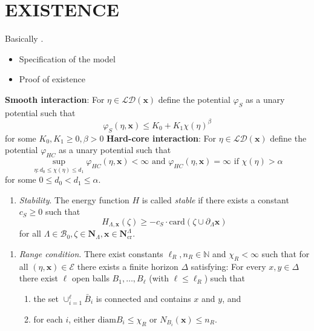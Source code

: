\documentclass{kybernetika}
\newcommand{\x}{{\mathbf{x}}}
\begin{document}
\section{EXISTENCE}
Basically \cite{DDG12}.

\begin{itemize}
\item Specification of the model
\item Proof of existence
\end{itemize}


\noindent \textbf{Smooth interaction}:  For $\eta\in\mathcal {LD}(\x)$ define the potential $\varphi_S$ as a unary potential such that
$$\varphi_S(\eta,\x) \leq K_0 + K_1 \chi(\eta)^{\beta}$$
for some $K_0,K_1 \geq 0, \beta >0$\newline
\textbf{Hard-core interaction}: For $\eta\in\mathcal {LD}(\x)$ define the potential $\varphi_{HC}$ as a unary potential such that
$$\sup_{\eta: d_0 \leq \chi(\eta) \leq d_1} \varphi_{HC}(\eta,\x)  < \infty \text{ and } \varphi_{HC}(\eta,\x)=\infty \text{ if } \chi(\eta)>\alpha$$ 
for some $0\leq d_0 < d_1 \leq \alpha$. 



\begin{enumerate}[\textbf{(S)}] 
	\item \textit{Stability}. The energy function $H$ is called \textit{stable} if there exists a constant $c_S \geq 0$ such that 
		$$H_{\Lambda,\x}(\zeta) \geq -c_S \cdot \mathrm{card}(\zeta \cup \partial_\Lambda \x)$$
		for all $\Lambda \in \mathcal B_0, \zeta \in \mathbf N_\Lambda, \x \in \mathbf N^\Lambda_{\text{cr}}$.
\end{enumerate}



\begin{enumerate}[\textbf{(R)}]\label{(R)}
	\item \textit{Range condition}. There exist constants $\ell_R,n_R \in \mathbb N$ and $\chi_R < \infty$ such that for all $(\eta,\x) \in \mathcal E$ there exists a finite horizon $\Delta$ satisfying: For every $x,y \in \Delta$ there exist $\ell$ open balls $B_1, \dots, B_\ell$ (with $\ell \leq \ell_R$) such that
	\begin{enumerate}[-]
		\item the set $\cup^\ell_{i=1} \bar B_i$ is connected and contains $x$ and $y$, and 
		\item for each $i$, either $\text{diam} B_i \leq \chi_R$ or $N_{B_i}(\x) \leq n_R$.
	\end{enumerate}
\end{enumerate}
\end{document}
